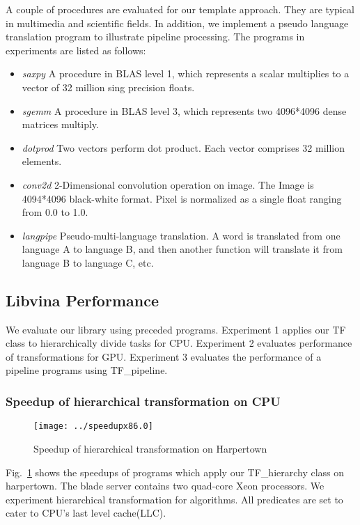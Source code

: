 A couple of procedures are evaluated for our template approach.  They
are typical in multimedia and scientific fields. In
addition, we implement a pseudo language translation program to
illustrate pipeline processing. The programs in experiments are listed
as follows:

\begin{itemize}
\item \textit{saxpy} A procedure in BLAS level 1, which represents a
  scalar multiplies to a vector of 32 million sing precision floats.
\item \textit{sgemm} A procedure in BLAS level 3, which represents two 4096*4096 dense matrices multiply.
\item \textit{dotprod} Two vectors perform dot product. Each vector
  comprises 32 million elements.
\item \textit{conv2d} 2-Dimensional convolution operation on image.  The Image
  is 4094*4096 black-white format. Pixel is normalized as a single
  float ranging from 0.0 to 1.0.
\item \textit{langpipe} Pseudo-multi-language translation. A word is translated from one language A to language B, and then another function will translate it from language B to language C, etc.
\end{itemize}

\subsection{Libvina Performance}
We evaluate our library using preceded programs. Experiment 1 applies our TF class to hierarchically divide
tasks for CPU. Experiment 2 evaluates performance of 
transformations for GPU. Experiment 3 evaluates the
performance of a pipeline programs using TF\_pipeline.
\subsubsection{Speedup of hierarchical transformation on CPU}\label{exp:1}
\begin{figure}
\texttt{[image: ../speedupx86.0]}
\caption{Speedup of hierarchical transformation on Harpertown}\label{fig:spdx86}
\end{figure}

Fig.~\ref{fig:spdx86} shows the speedups of programs which apply our
TF\_hierarchy class on harpertown. The blade
server contains two quad-core Xeon
processors. We experiment hierarchical transformation for
algorithms. All predicates are set to cater to CPU's last level cache(LLC).

